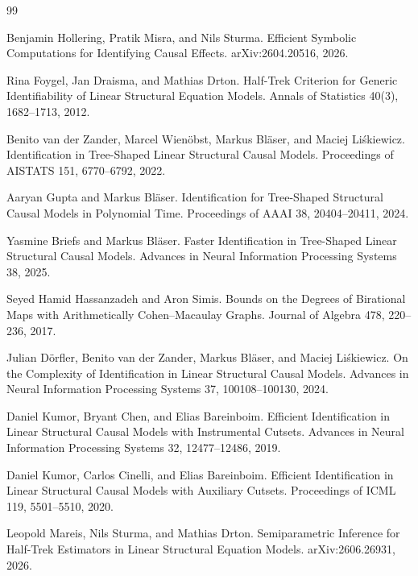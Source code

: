 \documentclass{article}
\begin{document}
\begin{thebibliography}{99}

   Benjamin Hollering, Pratik Misra, and Nils Sturma. Efficient Symbolic Computations for Identifying Causal Effects. arXiv:2604.20516, 2026.

   Rina Foygel, Jan Draisma, and Mathias Drton. Half-Trek Criterion for Generic Identifiability of Linear Structural Equation Models. Annals of Statistics 40(3), 1682--1713, 2012.

   Benito van der Zander, Marcel Wienöbst, Markus Bläser, and Maciej Liśkiewicz. Identification in Tree-Shaped Linear Structural Causal Models. Proceedings of AISTATS 151, 6770--6792, 2022.

   Aaryan Gupta and Markus Bläser. Identification for Tree-Shaped Structural Causal Models in Polynomial Time. Proceedings of AAAI 38, 20404--20411, 2024.

   Yasmine Briefs and Markus Bläser. Faster Identification in Tree-Shaped Linear Structural Causal Models. Advances in Neural Information Processing Systems 38, 2025.

   Seyed Hamid Hassanzadeh and Aron Simis. Bounds on the Degrees of Birational Maps with Arithmetically Cohen--Macaulay Graphs. Journal of Algebra 478, 220--236, 2017.

   Julian Dörfler, Benito van der Zander, Markus Bläser, and Maciej Liśkiewicz. On the Complexity of Identification in Linear Structural Causal Models. Advances in Neural Information Processing Systems 37, 100108--100130, 2024.

   Daniel Kumor, Bryant Chen, and Elias Bareinboim. Efficient Identification in Linear Structural Causal Models with Instrumental Cutsets. Advances in Neural Information Processing Systems 32, 12477--12486, 2019.

   Daniel Kumor, Carlos Cinelli, and Elias Bareinboim. Efficient Identification in Linear Structural Causal Models with Auxiliary Cutsets. Proceedings of ICML 119, 5501--5510, 2020.

   Leopold Mareis, Nils Sturma, and Mathias Drton. Semiparametric Inference for Half-Trek Estimators in Linear Structural Equation Models. arXiv:2606.26931, 2026.


\end{thebibliography}
\end{document}
